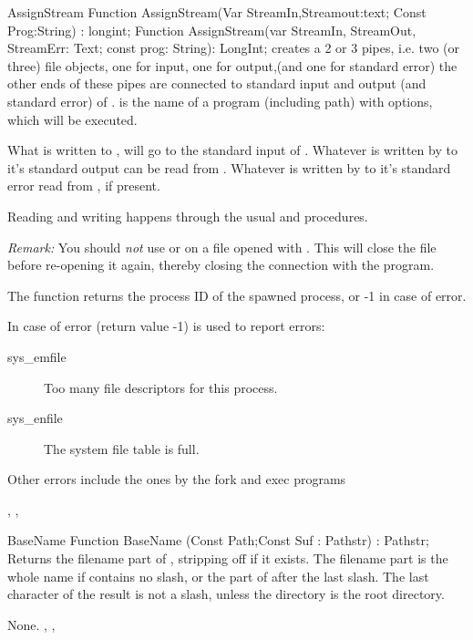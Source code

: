 \begin{function}{AssignStream}
\Declaration
Function AssignStream(Var StreamIn,Streamout:text;
                      Const Prog:String) : longint;
Function AssignStream(var StreamIn, StreamOut, StreamErr: Text; 
                      const prog: String): LongInt;
\Description
{} creates a 2 or 3 pipes, i.e. two (or three) file objects, one for 
input, one for output,(and one for standard error) the other ends of these 
pipes are connected to standard input and output (and standard error) of 
.  is the name of a program (including path) with options,
 which will be executed.

What is written to , will go to the standard input of
. Whatever is written by  to it's standard output 
can be read from . 
Whatever is written by  to it's standard error read from 
, if present. 

Reading and writing happens through the usual  and
 procedures.

{\em Remark:} You should {\em not} use  or  on a 
file opened with . This will close the file before re-opening 
it again, thereby closing the connection with the program.

The function returns the process ID of the spawned process, or -1 in case of
error.

\Errors
In case of error (return value -1)  is used to report 
errors:
\begin{description}
\item[sys\_emfile] Too many file descriptors for this process.
\item[sys\_enfile] The system file table is full.
\end{description}
Other errors include the ones by the fork and exec programs

\SeeAlso
{}, ,
\end{function}




\begin{function}{BaseName}
\Declaration
Function BaseName (Const Path;Const Suf : Pathstr) : Pathstr;
\Description
Returns the filename part of , stripping off  if it
exists.
The filename part is the whole name if  contains no slash,
or the part of  after the last slash.
The last character of the result is not a slash, unless the directory is the
root directory.

\Errors
None.
\SeeAlso
{}, , 
\end{function}


